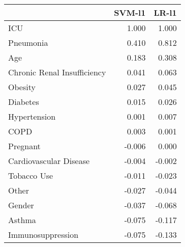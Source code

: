 \begin{tabular}{lrr}
\toprule
{} &  SVM-l1 &  LR-l1 \\
\midrule
ICU                         &   1.000 &  1.000 \\
Pneumonia                   &   0.410 &  0.812 \\
Age                         &   0.183 &  0.308 \\
Chronic Renal Insufficiency &   0.041 &  0.063 \\
Obesity                     &   0.027 &  0.045 \\
Diabetes                    &   0.015 &  0.026 \\
Hypertension                &   0.001 &  0.007 \\
COPD                        &   0.003 &  0.001 \\
Pregnant                    &  -0.006 &  0.000 \\
Cardiovascular Disease      &  -0.004 & -0.002 \\
Tobacco Use                 &  -0.011 & -0.023 \\
Other                       &  -0.027 & -0.044 \\
Gender                      &  -0.037 & -0.068 \\
Asthma                      &  -0.075 & -0.117 \\
Immunosuppression           &  -0.075 & -0.133 \\
\bottomrule
\end{tabular}
